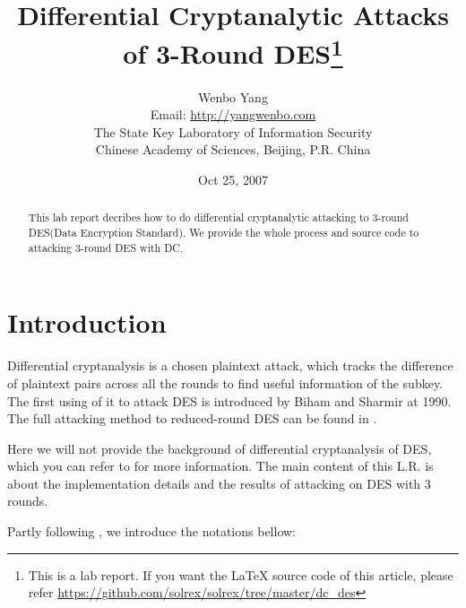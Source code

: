 \documentclass[a4paper,10pt]{article}
\begin{document}
\title{Differential Cryptanalytic Attacks of 3-Round DES\footnote{This is a lab report. If you want the \LaTeX{} source code of this article, please refer \url{https://github.com/solrex/solrex/tree/master/dc_des}}}
\author{Wenbo Yang\\Email: \url{http://yangwenbo.com}\\The State Key Laboratory of Information Security\\Chinese Academy of Sciences, Beijing, P.R. China}
\date{Oct 25, 2007}

\maketitle

\setlength{\parskip}{1ex}

\begin{abstract}

This lab report decribes how to do differential cryptanalytic attacking to 3-round DES(Data Encryption Standard\cite{DES}). We provide the whole process and source code to attacking 3-round DES with DC.
 
\end{abstract}

\section{Introduction}

Differential cryptanalysis is a chosen plaintext attack, which tracks the difference of plaintext pairs across all the rounds to find useful information of the subkey. The first using of it to attack DES is introduced by Biham and Sharmir\cite{BIHA91} at 1990. The full attacking method to reduced-round DES can be found in \cite{BIHA93}.

Here we will not provide the background of differential cryptanalysis of DES, which you can refer to \cite{BIHA93} for more information. The main content of this L.R. is about the implementation details and the results of attacking on DES with 3 rounds.

Partly following \cite{BIHA91}, we introduce the notations bellow:
\end{document}
